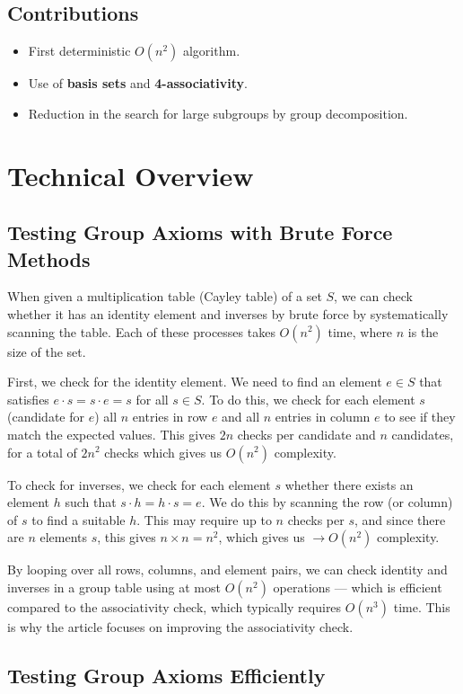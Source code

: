 \documentclass[sigconf]{acmart}
\begin{document}
\subsection{Contributions}
\begin{itemize}
    \item First deterministic \( O(n^2) \) algorithm.
    \item Use of \textbf{basis sets} and \textbf{4-associativity}.
    \item Reduction in the search for large subgroups by group decomposition.
\end{itemize}

\section{Technical Overview}
\subsection{Testing Group Axioms with Brute Force Methods}
When given a multiplication table (Cayley table) of a set $S$, we can check whether it has an identity element and inverses by brute force by systematically scanning the table. Each of these processes takes $O(n^2)$ time, where $n$ is the size of the set.

First, we check for the identity element. We need to find an element $e \in S$ that satisfies $e \cdot s = s \cdot e = s$ for all $s \in S$. To do this, we check for each element $s$ (candidate for $e$) all $n$ entries in row $e$ and all $n$ entries in column $e$ to see if they match the expected values. This gives $2n$ checks per candidate and $n$ candidates, for a total of $2n^2$ checks which gives us $O(n^2)$ complexity.

To check for inverses, we check for each element $s$ whether there exists an element $h$ such that $s \cdot h = h \cdot s = e$. We do this by scanning the row (or column) of $s$ to find a suitable $h$. This may require up to $n$ checks per $s$, and since there are $n$ elements $s$, this gives $n \times n = n^2$, which gives us $\to O(n^2)$ complexity.

By looping over all rows, columns, and element pairs, we can check identity and inverses in a group table using at most $O(n^2)$ operations — which is efficient compared to the associativity check, which typically requires $O(n^3)$ time. This is why the article focuses on improving the associativity check.

\subsection{Testing Group Axioms Efficiently}
\end{document}
